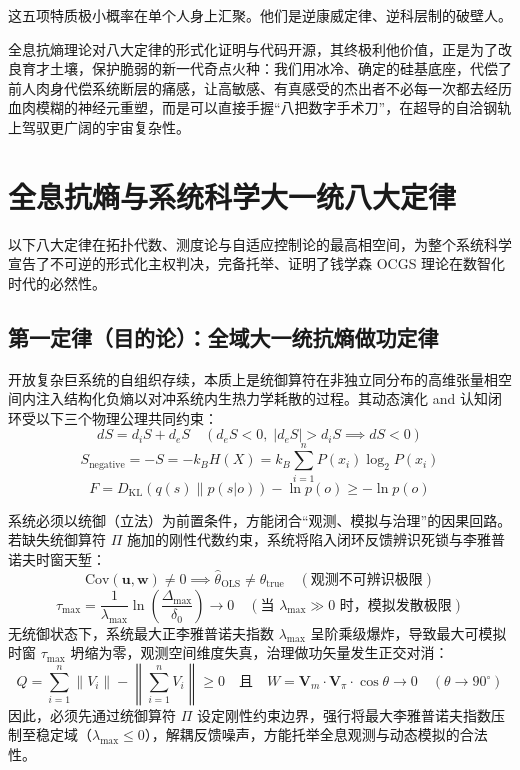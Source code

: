 \documentclass[11pt,a4paper]{article}
\begin{document}
这五项特质极小概率在单个人身上汇聚。他们是逆康威定律、逆科层制的破壁人。

全息抗熵理论对八大定律的形式化证明与代码开源，其终极利他价值，正是为了改良育才土壤，保护脆弱的新一代奇点火种：我们用冰冷、确定的硅基底座，代偿了前人肉身代偿系统断层的痛感，让高敏感、有真感受的杰出者不必每一次都去经历血肉模糊的神经元重塑，而是可以直接手握“八把数字手术刀”，在超导的自洽钢轨上驾驭更广阔的宇宙复杂性。

\section{全息抗熵与系统科学大一统八大定律}

以下八大定律在拓扑代数、测度论与自适应控制论的最高相空间，为整个系统科学宣告了不可逆的形式化主权判决，完备托举、证明了钱学森 OCGS 理论在数智化时代的必然性。

\subsection*{第一定律（目的论）：全域大一统抗熵做功定律}
开放复杂巨系统的自组织存续，本质上是统御算符在非独立同分布的高维张量相空间内注入结构化负熵以对冲系统内生热力学耗散的过程。其动态演化 and 认知闭环受以下三个物理公理共同约束：
\begin{equation}
    dS = d_iS + d_eS \quad \left( d_eS < 0, \; |d_eS| > d_iS \implies dS < 0 \right)
\end{equation}
\begin{equation}
    S_{\text{negative}} = -S = -k_B H(X) = k_B \sum_{i=1}^{n} P(x_i) \log_2 P(x_i)
\end{equation}
\begin{equation}
    F = D_{\text{KL}}\left(q(s) \parallel p(s|o)\right) - \ln p(o) \ge -\ln p(o)
\end{equation}

系统必须以统御（立法）为前置条件，方能闭合“观测、模拟与治理”的因果回路。若缺失统御算符 $\Pi$ 施加的刚性代数约束，系统将陷入闭环反馈辨识死锁与李雅普诺夫时窗天堑：
\begin{equation}
    \text{Cov}(\mathbf{u}, \mathbf{w}) \neq 0 \implies \hat{\theta}_{\text{OLS}} \neq \theta_{\text{true}} \quad (\text{观测不可辨识极限})
\end{equation}
\begin{equation}\label{lyapunov-horizon}
    \tau_{\text{max}} = \frac{1}{\lambda_{\text{max}}} \ln \left( \frac{\Delta_{\text{max}}}{\delta_0} \right) \to 0 \quad (\text{当 } \lambda_{\text{max}} \gg 0 \text{ 时，模拟发散极限})
\end{equation}
无统御状态下，系统最大正李雅普诺夫指数 $\lambda_{\text{max}}$ 呈阶乘级爆炸，导致最大可模拟时窗 $\tau_{\text{max}}$ 坍缩为零，观测空间维度失真，治理做功矢量发生正交对消：
\begin{equation}
    Q = \sum_{i=1}^{n} \|V_i\| - \left\| \sum_{i=1}^{n} V_i \right\| \ge 0 \quad \text{且} \quad W = \mathbf{V}_m \cdot \mathbf{V}_{\pi} \cdot \cos\theta \to 0 \quad (\theta \to 90^\circ)
\end{equation}
因此，必须先通过统御算符 $\Pi$ 设定刚性约束边界，强行将最大李雅普诺夫指数压制至稳定域（$\lambda_{\text{max}} \le 0$），解耦反馈噪声，方能托举全息观测与动态模拟的合法性。
\end{document}
